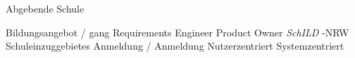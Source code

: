 Abgebende Schule

Bildungsangebot / gang
Requirements Engineer
Product Owner
 \textit{SchILD} -NRW
Schuleinzuggebietes
Anmeldung / Anmeldung
Nutzerzentriert
Systemzentriert